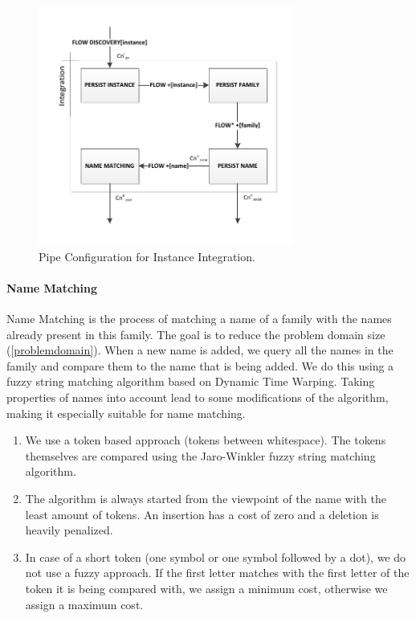 \begin{figure}[htb]
	\centering
		\includegraphics[width=0.75\textwidth]{fig/integrationpipe}
	\caption{Pipe Configuration for Instance Integration.}
	\label{fig:integrationpipe}
\end{figure}

\paragraph{Name Matching} Name Matching is the process of matching a name of a family with the names already present in this family. The goal is to reduce the problem domain size (\autoref{problemdomain}). When a new name is added, we query all the names in the family and compare them to the name that is being added. We do this using a fuzzy string matching algorithm based on Dynamic Time Warping. Taking properties of names into account lead to some modifications of the algorithm, making it especially suitable for name matching.

\begin{enumerate}
\item We use a token based approach (tokens between whitespace). The tokens themselves are compared using the Jaro-Winkler fuzzy string matching algorithm.
\item The algorithm is always started from the viewpoint of the name with the least amount of tokens. An insertion has a cost of zero and a deletion is heavily penalized.
\item In case of a short token (one symbol or one symbol followed by a dot), we do not use a fuzzy approach. If the first letter matches with the first letter of the token it is being compared with, we assign a minimum cost, otherwise we assign a maximum cost.
\end{enumerate}


